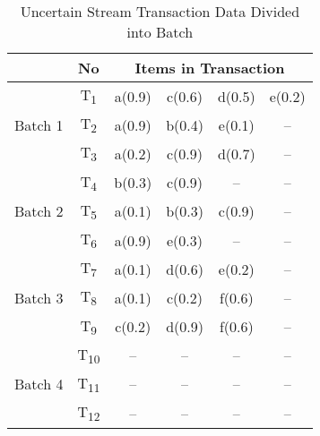 %
%
\begin{table}[t]
\centering

\begin{tabular}{|c|c|c|c|c|c|}
\hline
& No & \multicolumn{4}{c|}{Items in Transaction} \\ \hline \hline
\multirow{3}{*}{Batch 1}	&	T\textsubscript{1} & a(0.9) & c(0.6) & d(0.5) & e(0.2)\\
							&	T\textsubscript{2} & a(0.9) & b(0.4) & e(0.1) & --    \\
							&	T\textsubscript{3} & a(0.2) & c(0.9) & d(0.7) & --    \\\hline
\multirow{3}{*}{Batch 2}	&	T\textsubscript{4} & b(0.3) & c(0.9) & -- & --\\
							&	T\textsubscript{5} & a(0.1) & b(0.3) & c(0.9) & --    \\
							&	T\textsubscript{6} & a(0.9) & e(0.3) & -- & --        \\\hline
\multirow{3}{*}{Batch 3}	&	T\textsubscript{7} & a(0.1) & d(0.6) & e(0.2) & --    \\
							&	T\textsubscript{8} & a(0.1) & c(0.2) & f(0.6) & --    \\
							&	T\textsubscript{9} & c(0.2) & d(0.9) & f(0.6) & --    \\\hline
							
\multirow{3}{*}{Batch 4}	&	T\textsubscript{10} &  --  &  --  &  --  & --    \\
							&	T\textsubscript{11} &  --  &  --  &  --  & --    \\
							&	T\textsubscript{12} &  --  &  --  &  --  & --    \\\hline
\end{tabular}
\caption{Uncertain Stream Transaction Data Divided into Batch}
\label{table:transaction_batch}
\end{table}


%
%